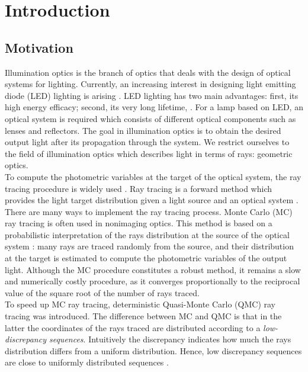 \chapter{Introduction}
\section{Motivation}
Illumination optics is the branch of optics that deals with the design of optical systems for lighting.  
Currently, an increasing interest in designing light emitting
diode (LED) lighting is arising \cite{moreno2008modeling}. 
LED lighting has two main
advantages: first, its high energy efficacy; second, its very long lifetime, \cite{taguchi2008present, haitz2011solid}. For a lamp based on LED, an optical system is required
which consists of different optical components such
as lenses and reflectors. The goal in illumination optics is to
obtain the desired output light after its propagation through the system. 
We restrict ourselves to the field of illumination optics which describes light in terms of rays: geometric optics.
\\ \indent To compute the photometric variables at the target of the
optical system, the ray tracing procedure is widely used \cite{glassner1989introduction}.
Ray tracing is a forward method which provides the light target distribution given a light source and an optical system \cite{Gross2005Handbook}. 
There are many ways to implement the ray tracing
process. Monte Carlo (MC) ray tracing is often used in nonimaging
optics. This method is based on a probabilistic interpretation
of the rays distribution at the source of the optical
system \cite{liu2010precise,Ting:1}: many rays are traced randomly from the source,
and their distribution at the target is estimated to compute the
photometric variables of the output light. Although the MC
procedure constitutes a robust method, it remains a slow and
numerically costly procedure, as it converges proportionally
to the reciprocal value of the square root of the number of rays
traced. \\ \indent To speed up MC ray tracing, deterministic Quasi-Monte Carlo (QMC) ray tracing was introduced. The difference between MC and QMC is that in the latter the coordinates of the rays traced are distributed according to a \textit{low-discrepancy sequences}. Intuitively the discrepancy indicates how much the rays distribution differs from a uniform distribution.  Hence, low discrepancy sequences are close to uniformly distributed sequences \cite{levy2002introduction}.
